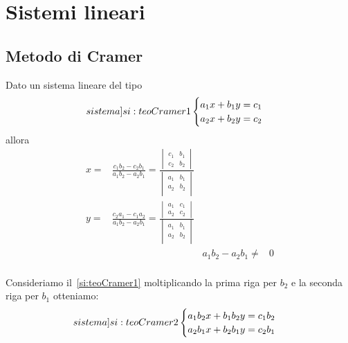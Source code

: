 \chapter{Sistemi lineari}
\section{Metodo di Cramer}
\begin{thm}\label{thm:teoCramer1}
	Dato un sistema lineare del tipo
\begin{equation}\label[sistema]{si:teoCramer1}
\begin{cases}
a_1x+b_1y=c_1\\
a_2x+b_2y=c_2
\end{cases}
\end{equation}
allora 
\begin{align*}
x=&\frac{c_{1} b_{2} - c_{2} b_{1}}{a_{1} b_{2} - a_{2} b_{1}}=\frac{\begin{vmatrix}
	c_{1} & b_{1}  \\
	c_{2} & b_{2}
	\end{vmatrix} }{\begin{vmatrix}
	a_{1} & b_{1}  \\
	a_{2} & b_{2}  \\
	\end{vmatrix}}\\
y=&\frac{c_{2} a_{1} - c_{1} a_{2}}{a_{1} b_{2} - a_{2} b_{1}}=\frac{\begin{vmatrix}
	a_{1} & c_{1}  \\
	a_{2} & c_{2}
	\end{vmatrix} }{\begin{vmatrix}
	a_{1} & b_{1}  \\
	a_{2} & b_{2}  \\
	\end{vmatrix}}\\
&&a_{1} b_{2} - a_{2} b_{1}\neq& 0\\
\end{align*}
\end{thm}
Consideriamo il~\cref{si:teoCramer1} moltiplicando la prima riga per $b_2$ e la seconda riga per $b_1$ otteniamo:
\begin{equation}\label[sistema]{si:teoCramer2}
\begin{cases}
a_1b_2x+b_1b_2y=c_1b_2\\
a_2b_1x+b_2b_1y=c_2b_1
\end{cases}
\end{equation}
